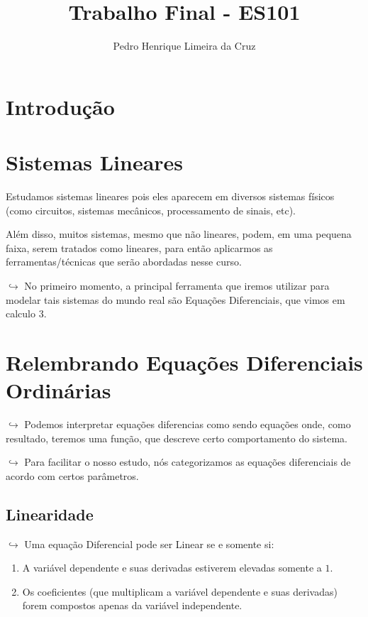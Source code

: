 \documentclass{article}
\author{Pedro Henrique Limeira da Cruz}
\title{Trabalho Final - ES101}
\begin{document}
\section{Introdução}\label{introduuxe7uxe3o}




\begin{itemize}

\hypertarget{sistemas-lineares}{%
\section{Sistemas Lineares}\label{sistemas-lineares}}

Estudamos sistemas lineares pois eles aparecem em
diversos sistemas físicos (como circuitos, sistemas mecânicos,
processamento de sinais, etc).

 Além disso, muitos sistemas, mesmo que não lineares,
podem, em uma pequena faixa, serem tratados como lineares, para então
aplicarmos as ferramentas/técnicas que serão abordadas nesse curso.

\(\hookrightarrow\) No primeiro momento, a principal ferramenta que
iremos utilizar para modelar tais sistemas do mundo real são Equações
Diferenciais, que vimos em calculo 3.

\hypertarget{relembrando-equauxe7uxf5es-diferenciais-ordinuxe1rias}{%
\section{Relembrando Equações Diferenciais
Ordinárias}\label{relembrando-equauxe7uxf5es-diferenciais-ordinuxe1rias}}

\(\hookrightarrow\) Podemos interpretar equações diferencias como sendo
equações onde, como resultado, teremos uma função, que descreve certo
comportamento do sistema.

\(\hookrightarrow\) Para facilitar o nosso estudo, nós categorizamos as
equações diferenciais de acordo com certos parâmetros.

\hypertarget{linearidade}{%
\subsection{Linearidade}\label{linearidade}}

\(\hookrightarrow\) Uma equação Diferencial pode ser Linear se e somente
si:

\begin{enumerate}
\def\labelenumi{\arabic{enumi}.}
\tightlist
\item
  A variável dependente e suas derivadas estiverem elevadas somente a
  \(1\).
\item
  Os coeficientes (que multiplicam a variável dependente e suas
  derivadas) forem compostos apenas da variável independente.
\end{enumerate}


\end{itemize}
\end{document}

